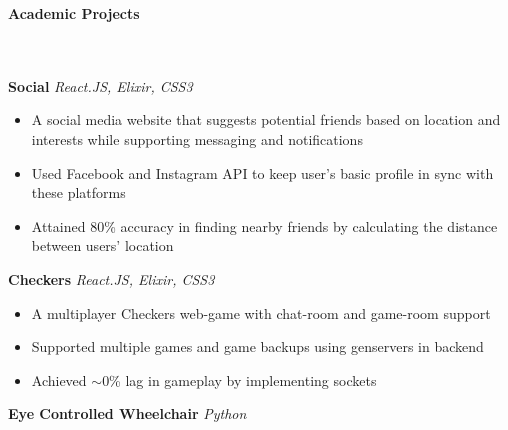 \documentclass[]{article}
\newcommand{\lineunder} {
    \vspace*{-8pt} \\
    \hrulefill \\
}
\newcommand{\header} [1] {
    {\vspace*{6pt} \fontsize{12}{12}\selectfont \textbf{#1}}
     \lineunder
}
\begin{document}
\header{Academic Projects}
{\hspace{2mm}\textbf{Social}} {\sl React.JS, Elixir, CSS3} \\
\vspace{-2mm}
\begin{itemize}
        \setlength\itemsep{0.2mm}
        \item A social media website that suggests potential friends based on location and
        interests while supporting messaging and notifications
        \item Used Facebook and Instagram API to keep user's basic profile in sync with these platforms
        \item Attained 80\% accuracy in finding nearby friends by calculating the distance between users' location
\end{itemize}
{\hspace{2mm}\textbf{Checkers}} {\sl React.JS, Elixir, CSS3} \\
\begin{itemize}
        \setlength\itemsep{0.2mm}
        \item A multiplayer Checkers web-game with chat-room and game-room support
        \item Supported multiple games and game backups using genservers in backend
        \item Achieved $\sim$0\% lag in gameplay by implementing sockets
\end{itemize}
{\hspace{2mm}\textbf{Eye Controlled Wheelchair}} {\sl Python} \\
\end{document}
